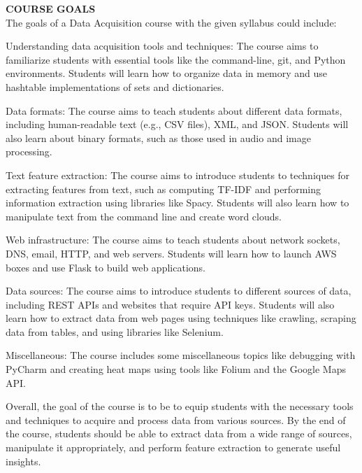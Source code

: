 \documentclass[11pt]{article}
\newenvironment{itemize*}%
  {\begin{itemize}%
    \setlength{\itemsep}{0pt}%
    \setlength{\parskip}{0pt}}%
  {\end{itemize}}
\begin{document}
\noindent \textbf{COURSE GOALS}\\

The goals of a Data Acquisition course with the given syllabus could include:
\begin{itemize*}
\item Understanding data acquisition tools and techniques: The course aims to familiarize students with essential tools like the command-line, git, and Python environments. Students will learn how to organize data in memory and use hashtable implementations of sets and dictionaries.

\item Data formats: The course aims to teach students about different data formats, including human-readable text (e.g., CSV files), XML, and JSON. Students will also learn about binary formats, such as those used in audio and image processing.

\item Text feature extraction: The course aims to introduce students to techniques for extracting features from text, such as computing TF-IDF and performing information extraction using libraries like Spacy. Students will also learn how to manipulate text from the command line and create word clouds.

\item Web infrastructure: The course aims to teach students about network sockets, DNS, email, HTTP, and web servers. Students will learn how to launch AWS boxes and use Flask to build web applications.

\item Data sources: The course aims to introduce students to different sources of data, including REST APIs and websites that require API keys. Students will also learn how to extract data from web pages using techniques like crawling, scraping data from tables, and using libraries like Selenium.

\item Miscellaneous: The course includes some miscellaneous topics like debugging with PyCharm and creating heat maps using tools like Folium and the Google Maps API.
\end{itemize*}

Overall, the goal of the course is to be to equip students with the necessary tools and techniques to acquire and process data from various sources. By the end of the course, students should be able to extract data from a wide range of sources, manipulate it appropriately, and perform feature extraction to generate useful insights.
\end{document}
